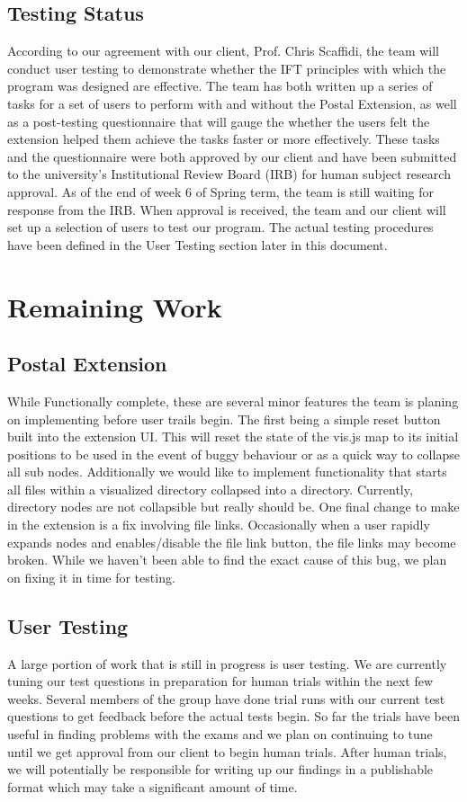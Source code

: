 \documentclass[letterpaper,10pt,titlepage,draftclsnofoot,onecolumn,onesided] {IEEEtran}
\begin{document}
	\subsection{Testing Status}
	According to our agreement with our client, Prof. Chris Scaffidi, the team will conduct user testing to demonstrate whether the IFT principles with which the program was designed are effective.
	The team has both written up a series of tasks for a set of users to perform with and without the Postal Extension, as well as a post-testing questionnaire that will gauge the whether the users felt the extension helped them achieve the tasks faster or more effectively.
	These tasks and the questionnaire were both approved by our client and have been submitted to the university's Institutional Review Board (IRB) for human subject research approval.
	As of the end of week 6 of Spring term, the team is still waiting for response from the IRB.
	When approval is received, the team and our client will set up a selection of users to test our program.
	The actual testing procedures have been defined in the User Testing section later in this document.
	
\section{Remaining Work}
	\subsection{Postal Extension}
	While Functionally complete, these are several minor features the team is planing on implementing before user trails begin. 
	The first being a simple reset button built into the extension UI. 
	This will reset the state of the vis.js map to its initial positions to be used in the event of buggy behaviour or as a quick way to collapse all sub nodes.
	Additionally we would like to implement functionality that starts all files within a visualized directory collapsed into a directory.
	Currently, directory nodes are not collapsible but really should be.
	One final change to make in the extension is a fix involving file links. 
	Occasionally when a user rapidly expands nodes and enables/disable the file link button, the file links may become broken.
	While we haven't been able to find the exact cause of this bug, we plan on fixing it in time for testing.
	\subsection{User Testing}
	A large portion of work that is still in progress is user testing. 
	We are currently tuning our test questions in preparation for human trials within the next few weeks.
	Several members of the group have done trial runs with our current test questions to get feedback before the actual tests begin.
	So far the trials have been useful in finding problems with the exams and we plan on continuing to tune until we get approval from our client to begin human trials.
	After human trials, we will potentially be responsible for writing up our findings in a publishable format which may take a significant amount of time.
\end{document}

